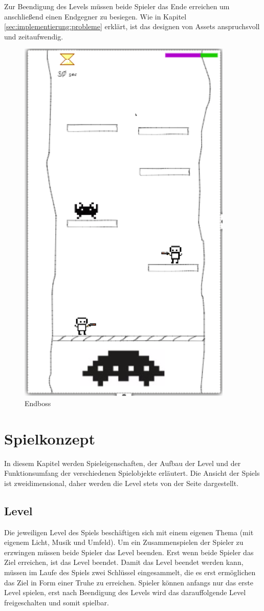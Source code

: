 Zur Beendigung des Levels müssen beide Spieler das Ende erreichen um anschließend einen Endgegner zu besiegen. Wie in Kapitel \ref{sec:implementierung:probleme} erklärt, ist das designen von Assets anspruchsvoll und zeitaufwendig.
\begin{figure}[H]
    \begin{center}
      \includegraphics[width=.22\linewidth]{img/konzeption/EndBoss}
      \caption{Endboss}
      \label{fig:konzeption:prototyping:endboss}
    \end{center}
\end{figure}

\section{Spielkonzept}
\label{sec:konzeption:konzept}
In diesem Kapitel werden Spieleigenschaften, der Aufbau der Level und der Funktionsumfang der verschiedenen Spielobjekte erläutert. Die Ansicht der Spiels ist zweidimensional, daher werden die Level stets von der Seite dargestellt.

\subsection{Level}
\label{sec:konzeption:konzept:level}
 Die jeweiligen Level des Spiels beschäftigen sich mit einem eigenen Thema (mit eigenem Licht, Musik und Umfeld). Um ein Zusammenspielen der Spieler zu erzwingen müssen beide Spieler das Level beenden. Erst wenn beide Spieler das Ziel erreichen, ist das Level beendet. Damit das Level beendet werden kann, müssen im Laufe des Spiels zwei Schlüssel eingesammelt, die es erst ermöglichen das Ziel in Form einer Truhe zu erreichen. Spieler können anfangs nur das erste Level spielen, erst nach Beendigung des Levels wird das darauffolgende Level freigeschalten und somit spielbar. 

